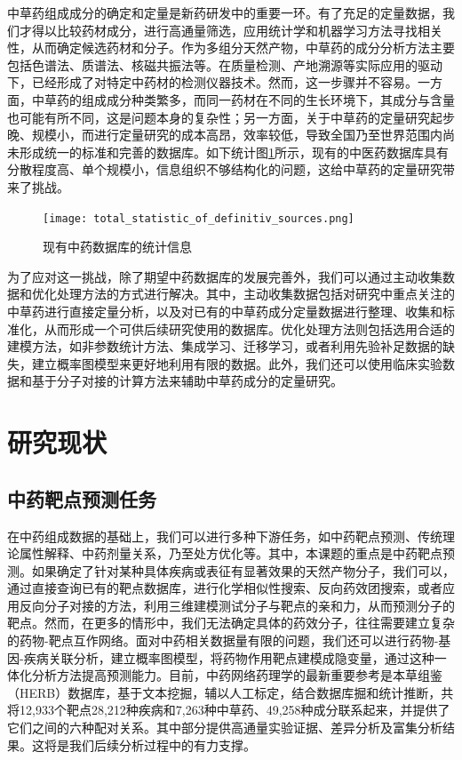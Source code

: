 中草药组成成分的确定和定量是新药研发中的重要一环。有了充足的定量数据，我们才得以比较药材成分，进行高通量筛选，应用统计学和机器学习方法寻找相关性，从而确定候选药材和分子。作为多组分天然产物，中草药的成分分析方法主要包括色谱法、质谱法、核磁共振法等。\cite{中药有效部位及成分提取工艺和检测方法_2007}在质量检测、产地溯源等实际应用的驱动下，已经形成了对特定中药材的检测仪器技术。然而，这一步骤并不容易。一方面，中草药的组成成分种类繁多，而同一药材在不同的生长环境下，其成分与含量也可能有所不同，这是问题本身的复杂性；另一方面，关于中草药的定量研究起步晚、规模小，而进行定量研究的成本高昂，效率较低，导致全国乃至世界范围内尚未形成统一的标准和完善的数据库。如下统计图\ref{fig:statistics}所示，现有的中医药数据库具有分散程度高、单个规模小，信息组织不够结构化的问题，这给中草药的定量研究带来了挑战。\cite{Yang_Zhu_Yao_Chen_Chen_Gu_Jiang_Chen_Zhang_Wu_et_al._2023}

\begin{figure}[H]
  \centering
  \texttt{[image: total\_statistic\_of\_definitiv\_sources.png]}
  \caption{现有中药数据库的统计信息}
  \label{fig:statistics}
\end{figure}


为了应对这一挑战，除了期望中药数据库的发展完善外，我们可以通过主动收集数据和优化处理方法的方式进行解决。其中，主动收集数据包括对研究中重点关注的中草药进行直接定量分析，以及对已有的中草药成分定量数据进行整理、收集和标准化，从而形成一个可供后续研究使用的数据库。优化处理方法则包括选用合适的建模方法，如非参数统计方法、集成学习、迁移学习，或者利用先验补足数据的缺失，建立概率图模型来更好地利用有限的数据。此外，我们还可以使用临床实验数据和基于分子对接的计算方法来辅助中草药成分的定量研究。

\section{研究现状}

\subsection{中药靶点预测任务}

在中药组成数据的基础上，我们可以进行多种下游任务，如中药靶点预测、传统理论属性解释、中药剂量关系，乃至处方优化等。其中，本课题的重点是中药靶点预测。如果确定了针对某种具体疾病或表征有显著效果的天然产物分子，我们可以，通过直接查询已有的靶点数据库，进行化学相似性搜索、反向药效团搜索，或者应用反向分子对接的方法，利用三维建模测试分子与靶点的亲和力，从而预测分子的靶点。\cite{Huang_Zhang_Zhou_Lin_Chen_Lin_Mai_Huang_2018}然而，在更多的情形中，我们无法确定具体的药效分子，往往需要建立复杂的药物-靶点互作网络。面对中药相关数据量有限的问题，我们还可以进行药物-基因-疾病关联分析，建立概率图模型，将药物作用靶点建模成隐变量，通过这种一体化分析方法提高预测能力。目前，中药网络药理学的最新重要参考是本草组鉴（HERB）数据库，基于文本挖掘，辅以人工标定，结合数据库掘和统计推断，共将12,933个靶点28,212种疾病和7,263种中草药、49,258种成分联系起来，并提供了它们之间的六种配对关系。其中部分提供高通量实验证据、差异分析及富集分析结果。\cite{Fang_Dong_Liu_Guo_Zhao_Zhang_Bu_Liu_Huo_Cao_et_al._2021}这将是我们后续分析过程中的有力支撑。

